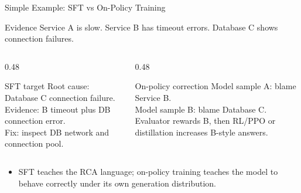 \begin{frame}{Simple Example: SFT vs On-Policy Training}
  \begin{block}{Evidence}
    Service A is slow. Service B has timeout errors. Database C shows
    connection failures.
  \end{block}
  \begin{columns}[T]
    \begin{column}{0.48\textwidth}
      \begin{block}{SFT target}
        Root cause: Database C connection failure.\\
        Evidence: B timeout plus DB connection error.\\
        Fix: inspect DB network and connection pool.
      \end{block}
    \end{column}
    \begin{column}{0.48\textwidth}
      \begin{block}{On-policy correction}
        Model sample A: blame Service B.\\
        Model sample B: blame Database C.\\
        Evaluator rewards B, then RL/PPO or distillation increases B-style answers.
      \end{block}
    \end{column}
  \end{columns}
  \vspace{0.4em}
  \begin{itemize}
    \item SFT teaches the RCA language; on-policy training teaches the model to
      behave correctly under its own generation distribution.
  \end{itemize}
\end{frame}


